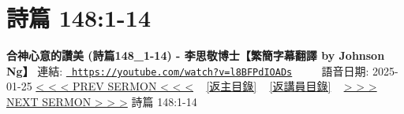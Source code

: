 \documentclass{book}
\begin{document}
\section{詩篇 148:1-14}
\label{sec:l8BFPdIOADs}
\textbf{合神心意的讚美 (詩篇148\_1-14) - 李思敬博士【繁簡字幕翻譯 by Johnson Ng】}
\newline
\newline
連結: \href{https://youtube.com/watch?v=l8BFPdIOADs}{\texttt{ https://youtube.com/watch?v=l8BFPdIOADs}} ~~~~ 語音日期: 2025-01-25 
\newline
\newline
\hyperref[sec:YdX9gstJs1g]{< < < PREV SERMON < < <}
~
\hyperlink{toc}{[返主目錄]}
~
\hyperref[ch:preacher2]{[返講員目錄]}
~
\hyperref[sec:fJrsPMmDHtU]{> > > NEXT SERMON > > >}
\newline
\newline
詩篇 148:1-14
\newline
\end{document}
